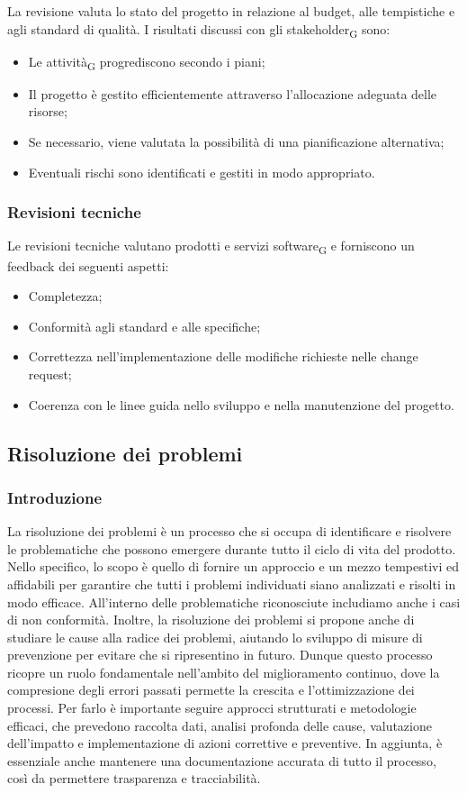 {{
La revisione valuta lo stato del progetto in relazione al budget, alle tempistiche e agli standard di qualità. I risultati discussi con gli
{stakeholder\textsubscript{G}} sono:
\begin{itemize}
    \item Le {attività\textsubscript{G}} progrediscono secondo i piani;
    \item Il progetto è gestito efficientemente attraverso l'allocazione adeguata delle risorse;
    \item Se necessario, viene valutata la possibilità di una pianificazione alternativa;
    \item Eventuali rischi sono identificati e gestiti in modo appropriato.
\end{itemize}

\subsubsection{Revisioni tecniche}
Le revisioni tecniche valutano prodotti e servizi {software\textsubscript{G}} e forniscono un feedback dei seguenti aspetti:
\begin{itemize}
    \item Completezza;
    \item Conformità agli standard e alle specifiche;
    \item Correttezza nell'implementazione delle modifiche richieste nelle change request;
    \item Coerenza con le linee guida nello sviluppo e nella manutenzione del progetto.
\end{itemize}

\subsection{Risoluzione dei problemi}
\subsubsection{Introduzione}
La risoluzione dei problemi è un processo che si occupa di identificare e risolvere le problematiche che possono emergere durante tutto il ciclo
di vita del prodotto. Nello specifico, lo scopo è quello di fornire un approccio e un mezzo tempestivi ed affidabili per garantire che tutti
i problemi individuati siano analizzati e risolti in modo efficace. All'interno delle problematiche riconosciute includiamo anche i casi di non
conformità. Inoltre, la risoluzione dei problemi si propone anche di studiare le cause alla radice dei problemi, aiutando lo sviluppo di misure
di prevenzione per evitare che si ripresentino in futuro. Dunque  questo processo ricopre un ruolo fondamentale nell'ambito del miglioramento
continuo, dove la compresione degli errori passati permette la crescita e l'ottimizzazione dei processi. Per farlo è importante seguire
approcci strutturati e metodologie efficaci, che prevedono raccolta dati, analisi profonda delle cause, valutazione dell'impatto e implementazione
di azioni correttive e preventive. In aggiunta, è essenziale anche mantenere una documentazione accurata di tutto il processo, così da
permettere trasparenza e tracciabilità.

}}
